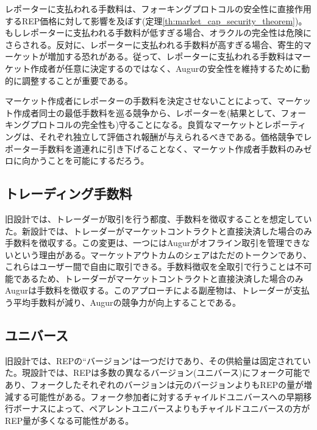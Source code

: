 \documentclass[floatfix,reprint,nofootinbib,amsmath,amssymb,epsfig,pre,floats,letterpaper,groupedaffiliation]{revtex4-1}
\theoremstyle{definition}
\theoremstyle{definition}
\theoremstyle{definition}
\begin{document}
\begin{appendix}
レポーターに支払われる手数料は、フォーキングプロトコルの安全性に直接作用するREP価格に対して影響を及ぼす(定理\ref{th:market_cap_security_theorem})。もしレポーターに支払われる手数料が低すぎる場合、オラクルの完全性は危険にさらされる。反対に、レポーターに支払われる手数料が高すぎる場合、寄生的マーケットが増加する恐れがある。従って、レポーターに支払われる手数料はマーケット作成者が任意に決定するのではなく、Augurの安全性を維持するために動的に調整することが重要である。

マーケット作成者にレポーターの手数料を決定させないことによって、マーケット作成者同士の最低手数料を巡る競争から、レポーターを(結果として、フォーキングプロトコルの完全性も)守ることになる。良質なマーケットとレポーティングは、それぞれ独立して評価され報酬が与えられるべきである。価格競争でレポーター手数料を道連れに引き下げることなく、マーケット作成者手数料のみゼロに向かうことを可能にするだろう。

\subsection{トレーディング手数料}\label{section:fees_paid_by_traders_old_v_new}

旧設計では、トレーダーが取引を行う都度、手数料を徴収することを想定していた。新設計では、トレーダーがマーケットコントラクトと直接決済した場合のみ手数料を徴収する。この変更は、一つにはAugurがオフライン取引を管理できないという理由がある。マーケットアウトカムのシェアはただのトークンであり、これらはユーザー間で自由に取引できる。手数料徴収を全取引で行うことは不可能であるため、トレーダーがマーケットコントラクトと直接決済した場合のみAugurは手数料を徴収する。このアプローチによる副産物は、トレーダーが支払う平均手数料が減り、Augurの競争力が向上することである。

\subsection{ユニバース}

旧設計では、REPの``バージョン"は一つだけであり、その供給量は固定されていた。現設計では、REPは多数の異なるバージョン(ユニバース)にフォーク可能であり、フォークしたそれぞれのバージョンは元のバージョンよりもREPの量が増減する可能性がある。フォーク参加者に対するチャイルドユニバースへの早期移行ボーナスによって、ペアレントユニバースよりもチャイルドユニバースの方がREP量が多くなる可能性がある。


\end{appendix}
\end{document}
